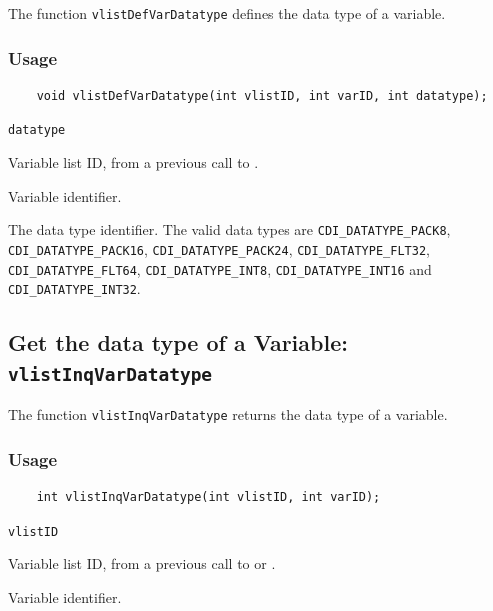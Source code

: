 The function {\texttt{vlistDefVarDatatype}} defines the data type of a variable.

\subsubsection*{Usage}

\begin{verbatim}
    void vlistDefVarDatatype(int vlistID, int varID, int datatype);
\end{verbatim}

\hspace*{4mm}\begin{minipage}[]{15cm}
\begin{deflist}{\texttt{datatype}\ }
\item[\texttt{vlistID}]
Variable list ID, from a previous call to {}.
\item[\texttt{varID}]
Variable identifier.
\item[\texttt{datatype}]
The data type identifier.
                    The valid {\CDI} data types are {\texttt{CDI\_DATATYPE\_PACK8}}, {\texttt{CDI\_DATATYPE\_PACK16}},
                    {\texttt{CDI\_DATATYPE\_PACK24}}, {\texttt{CDI\_DATATYPE\_FLT32}}, {\texttt{CDI\_DATATYPE\_FLT64}},
                    {\texttt{CDI\_DATATYPE\_INT8}}, {\texttt{CDI\_DATATYPE\_INT16}} and {\texttt{CDI\_DATATYPE\_INT32}}.

\end{deflist}
\end{minipage}


\subsection{Get the data type of a Variable: \texttt{vlistInqVarDatatype}}
\label{vlistInqVarDatatype}

The function {\texttt{vlistInqVarDatatype}} returns the data type of a variable.

\subsubsection*{Usage}

\begin{verbatim}
    int vlistInqVarDatatype(int vlistID, int varID);
\end{verbatim}

\hspace*{4mm}\begin{minipage}[]{15cm}
\begin{deflist}{\texttt{vlistID}\ }
\item[\texttt{vlistID}]
Variable list ID, from a previous call to {} or {}.
\item[\texttt{varID}]
Variable identifier.

\end{deflist}
\end{minipage}


